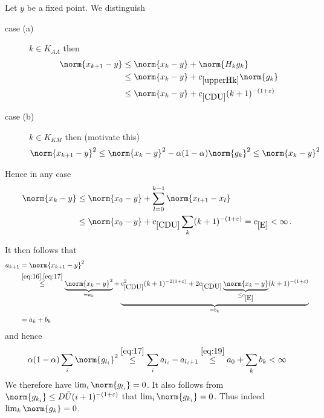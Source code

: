 \begin{frame}
	\begin{proofs}
	Let $y$ be a fixed point. We distinguish
	\begin{description}
		\item[case (a)]
		$k\in K_{AA}$ then
		\begin{equation}
		\begin{aligned}
			\norm{x_{k+1}-y}&\leq \norm{x_k-y}+\norm{H_kg_k} \\
			&\leq \norm{x_k-y}+\useconstant{upperHk}\norm{g_k} \\
			&\leq \norm{x_k-y}+\useconstant{CDU}(k+1)^{-(1+\e)}
			\label{eq:16}
		\end{aligned}
		\end{equation}
		\item[case (b)]
		$k\in K_{KM}$ then (motivate this)
		\begin{align}
			\norm{x_{k+1}-y}^2\leq \norm{x_k-y}^2-\alpha(1-\alpha)\norm{g_k}^2\leq \norm{x_k-y}^2
			\label{eq:17}
		\end{align}
	\end{description}
	Hence in any case
	\begin{align*}
		\norm{x_k-y}
		&\leq \norm{x_0-y}+\sum_{l=0}^{k-1}\norm{x_{l+1}-x_l} \\
		&\leq \norm{x_0-y}+\useconstant{CDU}\sum_k(k+1)^{-(1+\e)}
		= \useconstant{E}<\infty\,.
	\end{align*}
	\end{proofs}
\end{frame}


\begin{frame}
	\begin{proofs}
	It then follows that
	\begin{equation}
	\begin{aligned}
		a_{k+1} &= \norm{x_{k+1}-y}^2 \\
		&\stackrel{\eqref{eq:16}, \eqref{eq:17}}{\leq} \underbrace{\norm{x_k-y}^2}_{=a_k}+\underbrace{\useconstant{CDU}^2(k+1)^{-2(1+\e)}+2\useconstant{CDU}\underbrace{\norm{x_k-y}}_{\leq \useconstant{E}}(k+1)^{-(1+\e)}}_{=b_k} \\
		&= a_k+b_k
	\end{aligned}
	\label{eq:19}
	\end{equation}
	and hence
	\begin{align*}
		\alpha(1-\alpha)\sum_i\norm{g_{l_i}}^2
		\stackrel{\eqref{eq:17}}{\leq} \sum_i a_{l_i}-a_{l_i+1}
		\stackrel{\eqref{eq:19}}{\leq}a_0+\sum_k b_k
		<\infty
	\end{align*}
	We therefore have $\lim_i\norm{g_{l_i}}=0$. It also follows from $\norm{g_{k_i}}\leq D\barU (i+1)^{-(1+\e)}$ that $\lim_i\norm{g_{k_i}}=0$. Thus indeed $\lim_k\norm{g_k}=0$.
	\end{proofs}
\end{frame}


